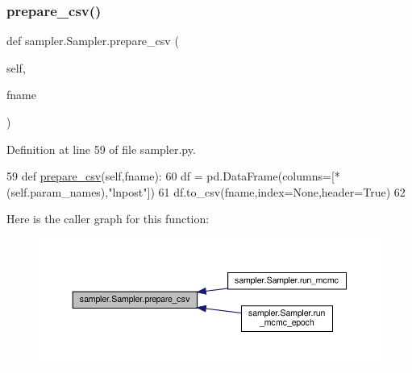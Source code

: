 \subsubsection{\texorpdfstring{prepare\+\_\+csv()}{prepare\_csv()}}
{\footnotesize\ttfamily def sampler.\+Sampler.\+prepare\+\_\+csv (\begin{DoxyParamCaption}\item[{}]{self,  }\item[{}]{fname }\end{DoxyParamCaption})}



Definition at line 59 of file sampler.\+py.


\begin{DoxyCode}
59     \textcolor{keyword}{def }\hyperlink{classsampler_1_1Sampler_ad8e9c065a95873230d9e0310f1b893cc}{prepare\_csv}(self,fname):
60         df = pd.DataFrame(columns=[*(self.param\_names),\textcolor{stringliteral}{"lnpost"}])
61         df.to\_csv(fname,index=\textcolor{keywordtype}{None},header=\textcolor{keyword}{True})
62         
\end{DoxyCode}
Here is the caller graph for this function\+:\nopagebreak
\begin{figure}[H]
\begin{center}
\leavevmode
\includegraphics[width=350pt]{d3/d8a/classsampler_1_1Sampler_ad8e9c065a95873230d9e0310f1b893cc_icgraph}
\end{center}
\end{figure}
\mbox{\label{classsampler_1_1Sampler_ab35f387d6b11e001d006731559e09f56}} 
